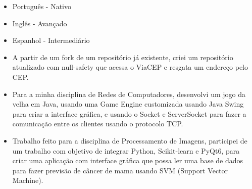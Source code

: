 \begin{itemize}
    \setlength\itemsep{1em}
    \item Português - Nativo 
    \item Inglês \hspace{16pt}- Avançado
    \item Espanhol \hspace{1pt} - Intermediário
\end{itemize}







\begin{itemize}
\item A partir de um fork de um repositório já existente, criei um repositório atualizado com null-safety que 
acessa o ViaCEP e resgata um endereço pelo CEP.
\end{itemize}
\smallskip
{}
\begin{itemize}
\item Para a minha disciplina de Redes de Computadores, desenvolvi um jogo da velha em Java, usando uma Game Engine customizada usando 
Java Swing para criar a interface gráfica, e usando o Socket e ServerSocket para fazer a comunicação entre os clientes usando o protocolo TCP.
\end{itemize}
\smallskip
{}
\begin{itemize}
\item Trabalho feito para a disciplina de Processamento de Imagens, participei de um trabalho com objetivo
de integrar Python, Scikit-learn e PyQt6, para criar uma aplicação com interface gráfica que possa ler uma base de dados 
para fazer previsão de câncer de mama usando SVM (Support Vector Machine).
\end{itemize}
\smallskip

